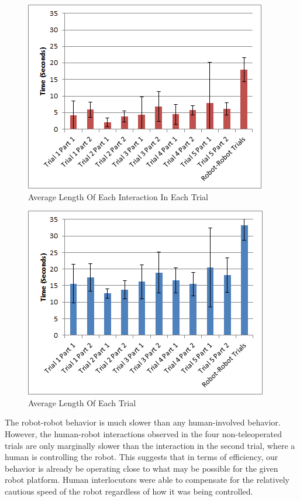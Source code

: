 \documentclass[letterpaper, 10 pt, conference]{ieeeconf}  %
\begin{document}
       \begin{figure}
      \centering
      \includegraphics{interaction_length.png}
      \caption{Average Length Of Each Interaction In Each Trial}
      \label{fig:Interaction}
   \end{figure}


     \begin{figure}
      \centering
      \includegraphics{trial_length.png}
      \caption{Average Length Of Each Trial}
      \label{fig:Trial}
   \end{figure}

The robot-robot behavior is much slower than any human-involved behavior. However, the human-robot interactions observed in the four non-teleoperated trials are only marginally slower than the interaction in the second trial, where a human is controlling the robot. This suggests that in terms of efficiency, our behavior is already be operating close to what may be possible for the given robot platform. Human interlocutors were able to compensate for the relatively cautious speed of the robot regardless of how it was being controlled. 
\end{document}
